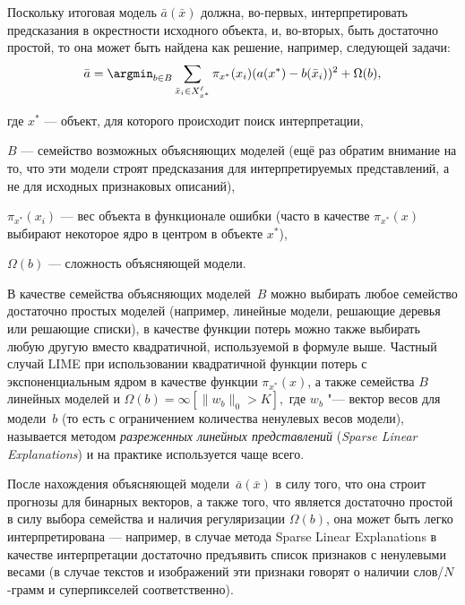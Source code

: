 \documentclass[12pt,a4paper]{article}
\begin{document}
	\par Поскольку итоговая модель $\bar{a}(\bar{x})$ должна, во-первых, интерпретировать предсказания в окрестности исходного объекта, и, во-вторых, быть достаточно простой, то она может быть найдена как решение, например, следующей задачи:
	\[
	\bar{a} = \argmin_{b \in B} \sum_{\bar{x}_i \in X_{x^*}^\ell} \pi_{x^*} (x_i) (a(x^*) - b(\bar{x}_i))^2 + \Omega(b),
	\]
	
	где $x^*$ — объект, для которого происходит поиск интерпретации, 
	\par $B$ — семейство возможных объясняющих моделей (ещё раз обратим внимание на то, что эти модели строят предсказания для интерпретируемых представлений, а не для исходных признаковых описаний), 
	\par $\pi_{x^*}(x_i)$ — вес объекта в функционале ошибки (часто в качестве $\pi_{x^*}(x)$ выбирают некоторое ядро в центром в объекте $x^*$), 
	\par $\Omega(b)$ — сложность объясняющей модели. 
	\par В качестве семейства объясняющих моделей~$B$ можно выбирать любое семейство достаточно простых моделей (например, линейные модели, решающие деревья или решающие списки), в качестве функции потерь можно также выбирать любую другую вместо квадратичной, используемой в формуле выше. Частный случай LIME при использовании квадратичной функции потерь с экспоненциальным ядром в качестве функции $\pi_{x^*}(x)$, а также семейства $B$ линейных моделей и $\Omega(b) = \infty [\| w_b\|_0 > K],$ где $w_b$ "--- вектор весов для модели~$b$ (то есть с ограничением количества ненулевых весов модели), называется методом \emph{разреженных линейных представлений} (\emph{Sparse Linear Explanations}) и на практике используется чаще всего.
	\par После нахождения объясняющей модели~$\bar{a}(\bar{x})$ в силу того, что она строит прогнозы для бинарных векторов, а также того, что является достаточно простой в силу выбора семейства и наличия регуляризации $\Omega(b)$, она может быть легко интерпретирована — например, в случае метода Sparse Linear Explanations в качестве интерпретации достаточно предъявить список признаков с ненулевыми весами (в случае текстов и изображений эти признаки говорят о наличии слов/$N$-грамм и суперпикселей соответственно).
\end{document}

